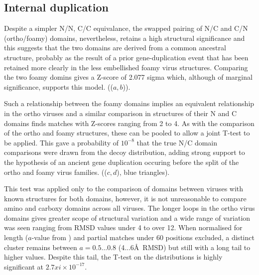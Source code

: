 %
%
%
%

\subsection{Internal duplication}

Despite a simpler N/N, C/C equivalance, the swapped pairing of N/C and C/N (ortho/foamy)
domains, nevertheless, retains a high structural significance and this
suggests that the two domains are derived from a common ancestral structure, probably
as the result of a prior gene-duplication event that has been retained more clearly
in the less embellished foamy virus structures.   Comparing the two foamy domins gives
a Z-score of 2.077 sigma which, although of marginal significance, supports this model.
(($a,b$)).

Such a relationship between the foamy domains implies an equivalent relationship
in the ortho viruses and a similar comparison in structures of their N and C domains
finds matches with Z-scores ranging from 2 to 4.   As with the comparison of the 
ortho and foamy structures, these can be pooled to allow a joint T-test to be applied.  
This gave a probability of $10^{-8}$ that the true N/C domain
comparisons were drawn from the decoy distribution, adding strong support to the
hypothesis of an ancient gene duplication occuring before the split of the ortho 
and foamy virus families. (($c,d$), blue triangles).

This test was applied only to the comparison of domains between viruses with 
known structures for both domains, however, it is not unreasonable to compare
amino and carboxy domains across all viruses.  The longer loops in the ortho virus
domains gives greater scope of structural variation and a wide range of variation
was seen ranging from RMSD values under 4 to over 12.  
When normalised for length ($a$-value from ) and partial matches under
60 positions excluded, a distinct cluster remains between $a=0.5\ldots0.8$ (4...6\AA\ 
RMSD) but still with a long tail to higher values.
Despite this tail, the T-test on the distributions is highly significant at $2.7xi \times 10^{-17}$.

